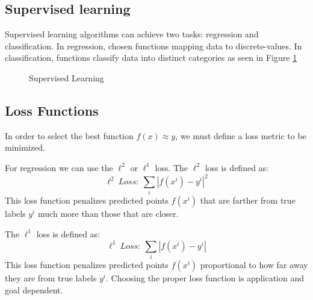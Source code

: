 \documentclass[twoside]{article}
\begin{document}
\subsection{Supervised learning}

Supervised learning algorithms can achieve two tasks: regression and classification. In regression, chosen functions mapping data to discrete-values. In classification, functions classify data into distinct categories as seen in Figure \ref{fig:supervised_learning}

\begin{figure}[!ht]%
    \centering
    \qquad
    \caption{Supervised Learning}%
    \label{fig:supervised_learning}%
\end{figure}

\subsection{Loss Functions}

In order to select the best function $f(x) \approx y$, we must define a loss metric to be minimized.

For regression we can use the $\ell^2$ or $\ell^1$ loss. The $\ell^2$ loss is defined as:
$$\ell^2 \ Loss: \ \sum_{i} |f(x^i) - y^i|^2$$
This loss function penalizes predicted points $f(x^i)$ that are farther from true labels $y^i$ much more than those that are closer.

The $\ell^1$ loss is defined as: 
$$ \ell^1 \ Loss: \ \sum_{i} |f(x^i) - y^i|$$
This loss function penalizes predicted points $f(x^i)$ proportional to how far away they are from true labels $y^i$. Choosing the proper loss function is application and goal dependent. 
\end{document}
